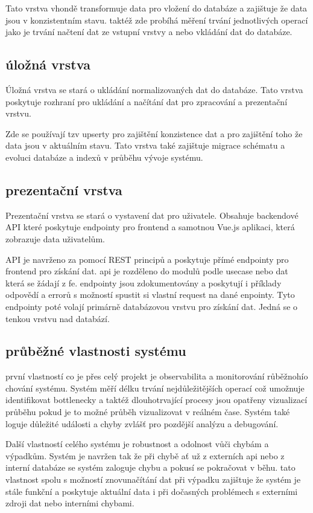 Tato vrstva vhondě transformuje data pro vložení do databáze a zajištuje že data jsou v konzistentním stavu. taktéž zde probíhá měření trvání jednotlivých operací jako je trvání načtení dat ze vstupní vrstvy a nebo vkládání dat do databáze.

\subsection{úložná vrstva}
Úložná vrstva se stará o ukládání normalizovaných dat do databáze. Tato vrstva poskytuje rozhraní pro ukládání a načítání dat pro zpracování a prezentační vrstvu.

Zde se používají tzv upserty pro zajištění konzistence dat a pro zajištění toho že data jsou v aktuálním stavu. Tato vrstva také zajištuje migrace schématu a evoluci databáze a indexů v průběhu vývoje systému.

\subsection{prezentační vrstva}
Prezentační vrstva se stará o vystavení dat pro uživatele. Obsahuje backendové API které poskytuje endpointy pro frontend a samotnou Vue.js aplikaci, která zobrazuje data uživatelům.

API je navrženo za pomocí REST principů a poskytuje přímé endpointy pro frontend pro získání dat. api je rozděleno do modulů podle usecase nebo dat která se žádají z fe. endpointy jsou zdokumentovány a poskytují i příklady odpovědí a errorů s možností spustit si vlastní request na dané enpointy. Tyto endpointy poté volají primárně databázovou vrstvu pro získání dat. Jedná se o tenkou vrstvu nad databází.

\subsection{průběžné vlastnosti systému}
první vlastností co je přes celý projekt je observabilita a monitorování růběžnohío chování systému. Systém měří délku trvání nejdůležitějších operací což umožnuje identifikovat bottlenecky a taktéž dlouhotrvající procesy jsou opatřeny vizualizací průběhu pokud je to možné průběh vizualizovat v reálném čase. Systém také loguje důležité události a chyby zvlášť pro pozdější analýzu a debugování.

Další vlastností celého systému je robustnost a odolnost vůči chybám a výpadkům. Systém je navržen tak že při chybě ať už z externích api nebo z interní databáze se systém zaloguje chybu a pokusí se pokračovat v běhu. tato vlastnost spolu s možností znovunačítání dat při výpadku zajištuje že systém je stále funkční a poskytuje aktuální data i při dočasných problémech s externími zdroji dat nebo interními chybami.
